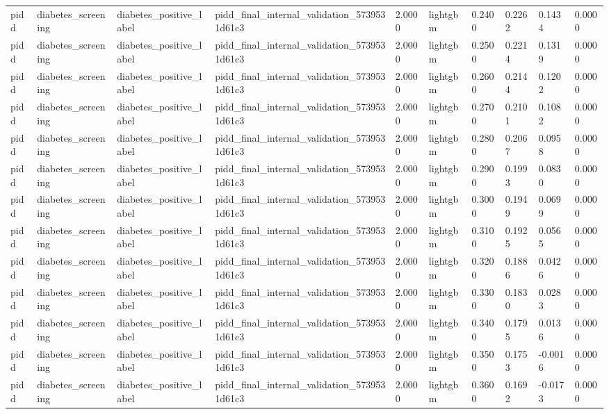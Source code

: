 \begin{tabular}{llllllllll}
pidd & diabetes\_screening & diabetes\_positive\_label & pidd\_final\_internal\_validation\_5739531d61c3 & 2.0000 & lightgbm & 0.2400 & 0.2262 & 0.1434 & 0.0000 \\
pidd & diabetes\_screening & diabetes\_positive\_label & pidd\_final\_internal\_validation\_5739531d61c3 & 2.0000 & lightgbm & 0.2500 & 0.2214 & 0.1319 & 0.0000 \\
pidd & diabetes\_screening & diabetes\_positive\_label & pidd\_final\_internal\_validation\_5739531d61c3 & 2.0000 & lightgbm & 0.2600 & 0.2144 & 0.1202 & 0.0000 \\
pidd & diabetes\_screening & diabetes\_positive\_label & pidd\_final\_internal\_validation\_5739531d61c3 & 2.0000 & lightgbm & 0.2700 & 0.2101 & 0.1082 & 0.0000 \\
pidd & diabetes\_screening & diabetes\_positive\_label & pidd\_final\_internal\_validation\_5739531d61c3 & 2.0000 & lightgbm & 0.2800 & 0.2067 & 0.0958 & 0.0000 \\
pidd & diabetes\_screening & diabetes\_positive\_label & pidd\_final\_internal\_validation\_5739531d61c3 & 2.0000 & lightgbm & 0.2900 & 0.1993 & 0.0830 & 0.0000 \\
pidd & diabetes\_screening & diabetes\_positive\_label & pidd\_final\_internal\_validation\_5739531d61c3 & 2.0000 & lightgbm & 0.3000 & 0.1949 & 0.0699 & 0.0000 \\
pidd & diabetes\_screening & diabetes\_positive\_label & pidd\_final\_internal\_validation\_5739531d61c3 & 2.0000 & lightgbm & 0.3100 & 0.1925 & 0.0565 & 0.0000 \\
pidd & diabetes\_screening & diabetes\_positive\_label & pidd\_final\_internal\_validation\_5739531d61c3 & 2.0000 & lightgbm & 0.3200 & 0.1886 & 0.0426 & 0.0000 \\
pidd & diabetes\_screening & diabetes\_positive\_label & pidd\_final\_internal\_validation\_5739531d61c3 & 2.0000 & lightgbm & 0.3300 & 0.1830 & 0.0283 & 0.0000 \\
pidd & diabetes\_screening & diabetes\_positive\_label & pidd\_final\_internal\_validation\_5739531d61c3 & 2.0000 & lightgbm & 0.3400 & 0.1795 & 0.0136 & 0.0000 \\
pidd & diabetes\_screening & diabetes\_positive\_label & pidd\_final\_internal\_validation\_5739531d61c3 & 2.0000 & lightgbm & 0.3500 & 0.1753 & -0.0016 & 0.0000 \\
pidd & diabetes\_screening & diabetes\_positive\_label & pidd\_final\_internal\_validation\_5739531d61c3 & 2.0000 & lightgbm & 0.3600 & 0.1692 & -0.0173 & 0.0000 \\

\end{tabular}
